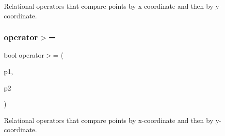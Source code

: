 Relational operators that compare points by x-\/coordinate and then by y-\/coordinate. 

\mbox{\label{classGPoint_a0f6d51aeb0175e5c7ae32b43f732a742}} 
\subsubsection{\texorpdfstring{operator$>$=}{operator>=}}
{\footnotesize\ttfamily bool operator$>$= (\begin{DoxyParamCaption}\item[{const \mbox{\hyperlink{classGPoint}{G\+Point}} \&}]{p1,  }\item[{const \mbox{\hyperlink{classGPoint}{G\+Point}} \&}]{p2 }\end{DoxyParamCaption})\hspace{0.3cm}{\ttfamily [friend]}}



Relational operators that compare points by x-\/coordinate and then by y-\/coordinate. 

